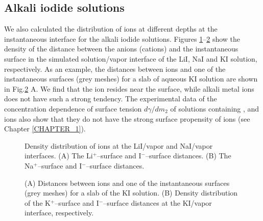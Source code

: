 \subsection{Alkali iodide solutions}
We also calculated the distribution of ions at different depths at the instantaneous interface for the alkali iodide solutions.
Figures \ref{fig:prob_dist_Li_surf_I_surf}--\ref{fig:prob_dist_K_surf_I_surf} show the density of the distance between the anions (cations) 
and the instantaneous surface in the simulated solution/vapor interface of the LiI, NaI and KI solution, respectively. 
As an example, the distances between ions and one of the instantaneous surfaces (grey meshes) 
for a slab of aqueous KI solution are shown in Fig.\thinspace\ref{fig:prob_dist_K_surf_I_surf} A. 
We find that the \I ion resides near the surface, while alkali metal ions does not have such a strong tendency. 
The experimental data of the concentration dependence of surface tension $d\gamma/dm_2$ of solutions 
containing \Li, \Na and \K ions also show that they do not have the strong surface propensity of \I ions (see Chapter \thinspace\ref{CHAPTER_1}).
\begin{figure}[H]%
    \centering
    \qquad
    \caption{
Density distribution of ions at the LiI/vapor and NaI/vapor interfaces.   
(A) 
The Li$^+$--surface and I$^-$--surface distances. 
(B)
The Na$^+$--surface and I$^-$--surface distances. 
}%
    \label{fig:prob_dist_Li_surf_I_surf}%
\end{figure}
\begin{figure}[H]%
    \centering
    \qquad
    \caption{
(A) 
Distances between ions and one of the instantaneous surfaces (grey meshes) for a slab of the KI solution. 
(B)
Density distribution of the K$^+$--surface and I$^-$--surface distances at the KI/vapor interface, respectively. 
}%
    \label{fig:prob_dist_K_surf_I_surf}%
\end{figure}
%
